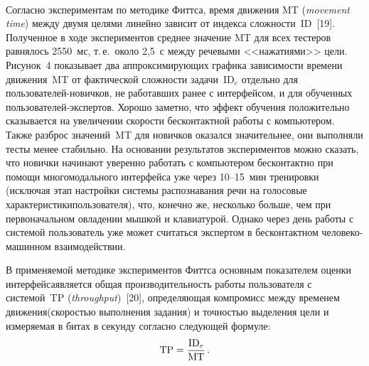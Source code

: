 \begin{multicols}{2}
\begin{figure*} %
 \vspace*{1pt}
 \begin{center}
 \mbox{%
 \epsfxsize=156.193mm
 }
 \end{center}
 \vspace*{-9pt}
 \begin{minipage}[t]{78mm}
\end{minipage}
\hfill
\begin{minipage}[t]{78mm}
\end{minipage}
\end{figure*}
    
  Согласно экспериментам по методике Фиттса, время движения 
 MT (\textit{movement time}) между двумя целями линейно зависит от индекса 
слож\-ности~ID~[19]. Полученное в ходе экспериментов среднее значение 
MT для всех тестеров равнялось 2550~мс, т.\,е.\ около 2,5~с между 
речевыми <<нажатиями>> цели. Рисунок~4 показывает два 
аппроксимирующих графика зависимости времени движения~MT от 
фактической сложности задачи~ID$_e$ отдельно для поль\-зо\-ва\-те\-лей-но\-вич\-ков, не 
работавших ранее с интерфейсом, и для обученных поль\-зо\-ва\-те\-лей-экс\-пер\-тов. 
Хорошо заметно, что эффект обучения положительно сказывается на 
увеличении скорости бесконтактной работы с компьютером. Также разброс 
значений~MT для новичков оказался значительнее, они выполняли тесты 
менее стабильно. На основании результатов экспериментов можно сказать, что 
новички начинают уверенно работать с компьютером бесконтактно при 
помощи многомодального интерфейса уже через 10--15~мин тренировки 
(исключая этап настройки системы распознавания речи на голосовые 
характеристики\linebreak пользователя), что, конечно же, несколько больше, чем при 
первоначальном овладении мышкой и клавиатурой. Однако через день работы с 
системой пользователь уже может считаться экспертом в бесконтактном 
человеко-машинном взаимодействии.


  В применяемой методике экспериментов \mbox{Фиттса} основным показателем 
оценки интерфейса\linebreak является общая производительность работы пользователя с 
системой~TP (\textit{throughput})~[20], определяющая компромисс между 
временем движения\linebreak (скоростью выполнения задания) и точностью выделения 
цели и измеряемая в битах в секунду согласно следующей формуле: 
  \begin{equation}
\mathrm{TP}=\displaystyle\frac{\displaystyle \mathrm{ID}_e\mathstrut}{\displaystyle \mathrm{MT}\mathstrut}\,.
  \label{e4kar}
  \end{equation}
  

\end{multicols}
